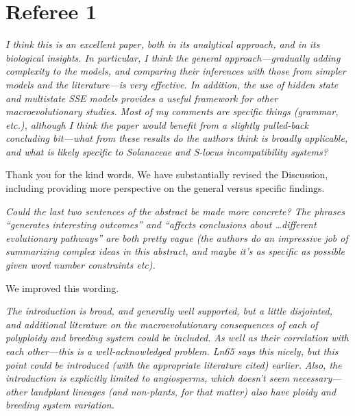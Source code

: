 \documentclass[11pt]{article}
\renewenvironment{quote}{\bigskip\noindent\itshape\ignorespaces}{\smallskip}
\begin{document}
\section{Referee 1}
\vspace{-11pt}

\begin{quote}
I think this is an excellent paper, both in its analytical approach, and in its biological insights.
In particular, I think the general approach---gradually adding complexity to the models, and comparing their inferences with those from simpler models and the literature---is very effective.
In addition, the use of hidden state and multistate SSE models provides a useful framework for other macroevolutionary studies. 
Most of my comments are specific things (grammar, etc.), although I think the paper would benefit from a slightly pulled-back concluding bit---what from these results do the authors think is broadly applicable, and what is likely specific to Solanaceae and S-locus incompatibility systems?
\end{quote}

Thank you for the kind words.
We have substantially revised the Discussion, including providing more perspective on the general versus specific findings. %

\begin{quote}
Could the last two sentences of the abstract be made more concrete?
The phrases ``generates interesting outcomes'' and ``affects conclusions about \ldots different evolutionary pathways'' are both pretty vague (the authors do an impressive job of summarizing complex ideas in this abstract, and maybe it's as specific as possible given word number constraints etc).
\end{quote}

We improved this wording.

\begin{quote}
The introduction is broad, and generally well supported, but a little disjointed, and additional literature on the macroevolutionary consequences of each of polyploidy and breeding system could be included.
As well as their correlation with each other---this is a well-acknowledged problem.
Ln65 says this nicely, but this point could be introduced (with the appropriate literature cited) earlier.
Also, the introduction is explicitly limited to angiosperms, which doesn't seem necessary---other landplant lineages (and non-plants, for that matter) also have ploidy and breeding system variation.
\end{quote}
\end{document}

